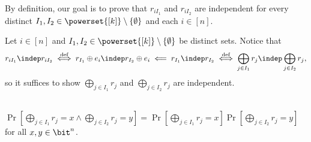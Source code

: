 \begin{answer}[i]
    By definition, our goal is to prove that $r_{iI_1}$ and $r_{iI_2}$ are independent for every distinct $I_1,I_2\in \powerset{[k]}\setminus \{\emptyset\}$ and each $i\in [n]$.
    
    Let $i\in [n]$ and $I_1,I_2\in \powerset{[k]}\setminus \{\emptyset\}$ be distinct sets. Notice that
    \[
        r_{iI_1}  \indep  r_{iI_2}
        \stackrel{\textrm{def}}{\iff} r_{I_1}\oplus e_i  \indep  r_{I_2} \oplus e_i
        \impliedby r_{I_1}  \indep  r_{I_2} 
        \stackrel{\textrm{def}}{\iff} \bigoplus_{j\in I_1} r_j \indep \bigoplus_{j\in I_2} r_j,
    \]
    so it suffices to show $\bigoplus_{j\in I_1} r_j$ and $\bigoplus_{j\in I_2} r_j$ are independent.

    \begin{goal}\ \\
        $
        \Pr\left[ \bigoplus_{j\in I_1} r_j = x \land \bigoplus_{j\in I_2} r_j=y \right]
        =\Pr\left[ \bigoplus_{j\in I_1} r_j = x \right]\Pr\left[ \bigoplus_{j\in I_2} r_j=y \right]
        $ for all $x,y\in \bit^n$.
    \end{goal}


\end{answer}
